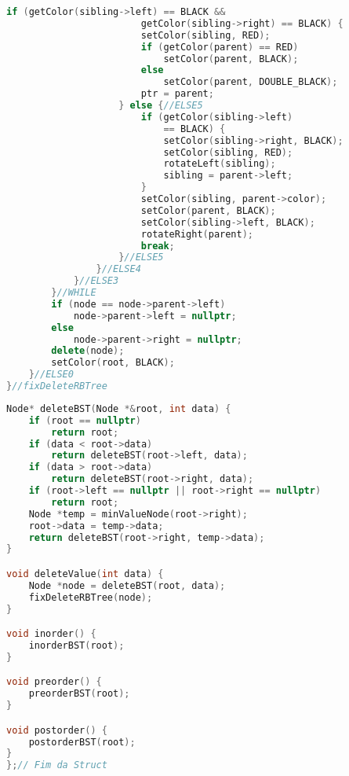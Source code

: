 \begin{lstlisting}[language=C++, title=Parte IV: Remoção (Parte 3 de 4)]
					if (getColor(sibling->left) == BLACK &&
                        getColor(sibling->right) == BLACK) {
						setColor(sibling, RED);
						if (getColor(parent) == RED)
							setColor(parent, BLACK);
						else
							setColor(parent, DOUBLE_BLACK);
						ptr = parent;
					} else {//ELSE5
						if (getColor(sibling->left) 
                            == BLACK) {
							setColor(sibling->right, BLACK);
							setColor(sibling, RED);
							rotateLeft(sibling);
							sibling = parent->left;
						}
						setColor(sibling, parent->color);
						setColor(parent, BLACK);
						setColor(sibling->left, BLACK);
						rotateRight(parent);
						break;
					}//ELSE5
				}//ELSE4
			}//ELSE3
		}//WHILE
		if (node == node->parent->left)
			node->parent->left = nullptr;
		else
			node->parent->right = nullptr;
		delete(node);
		setColor(root, BLACK);
	}//ELSE0
}//fixDeleteRBTree
\end{lstlisting}

\newpage

\begin{lstlisting}[language=C++, title=Parte IV: Remoção (Parte 4 de 4) (UFA!) e Travessias (Callers)]
Node* deleteBST(Node *&root, int data) {
	if (root == nullptr)
		return root;
	if (data < root->data)
		return deleteBST(root->left, data);
	if (data > root->data)
		return deleteBST(root->right, data);
	if (root->left == nullptr || root->right == nullptr)
		return root;
	Node *temp = minValueNode(root->right);
	root->data = temp->data;
	return deleteBST(root->right, temp->data);
}

void deleteValue(int data) {
	Node *node = deleteBST(root, data);
	fixDeleteRBTree(node);
}

void inorder() {
	inorderBST(root);
}

void preorder() {
	preorderBST(root);
}

void postorder() {
    postorderBST(root);
}
};// Fim da Struct
\end{lstlisting}